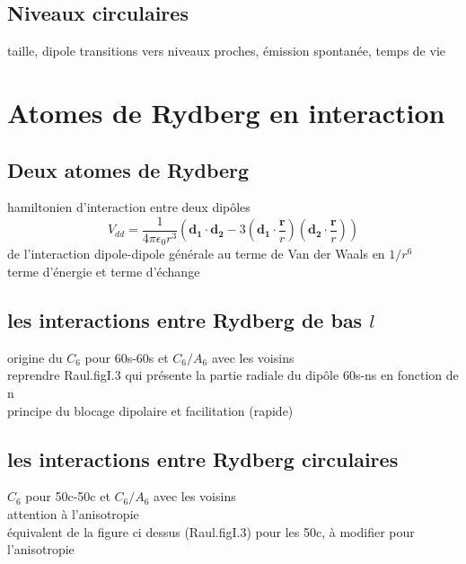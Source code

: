 	\subsection{Niveaux circulaires}
		\noindent taille, dipole
		\noindent transitions vers niveaux proches, émission spontanée, temps de vie

\section{Atomes de Rydberg en interaction}
	\subsection{Deux atomes de Rydberg}
		\noindent hamiltonien d'interaction entre deux dipôles
		\[
		V_{dd} = \frac{1}{4\pi\epsilon_0 r^3} \left( \mathbf{d_1}\cdot \mathbf{d_2} - 3(\mathbf{d_1}\cdot \frac{\mathbf{r}}{r})(\mathbf{d_2}\cdot\frac{\mathbf{r}}{r}) \right)
		\]
		\noindent de l'interaction dipole-dipole générale au terme de Van der Waals en $1/r^6$ \\
		\noindent terme d'énergie et terme d'échange
	\subsection{les interactions entre Rydberg de bas $l$}
		\noindent origine du $C_6$ pour 60s-60s et $C_6/A_6$ avec les voisins\\
		reprendre Raul.figI.3 qui présente la partie radiale du dipôle 60s-ns en fonction de n\\
		\noindent principe du blocage dipolaire et facilitation (rapide)
	\subsection{les interactions entre Rydberg circulaires}
		\noindent $C_6$ pour 50c-50c et $C_6/A_6$ avec les voisins \\
		\noindent attention à l'anisotropie\\
		équivalent de la figure ci dessus (Raul.figI.3) pour les 50c, à modifier pour l'anisotropie
